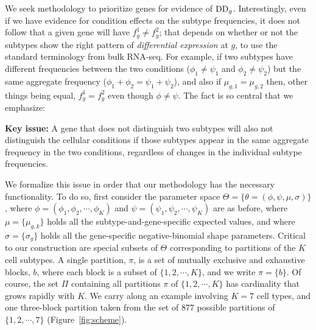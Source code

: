 \documentclass[aoas,preprint]{imsart}
\begin{document}
We seek methodology to prioritize genes for evidence
of ${\rm DD}_g$.  Interestingly, even if we have evidence for condition effects
on the subtype frequencies, it does not follow that a given
gene will have $f^1_g \neq f^2_g$; that depends on whether or not the subtypes
show the right pattern of {\em differential expression} at $g$, to use the 
standard terminology from bulk RNA-seq.  For example, if two subtypes have 
different frequencies between the two conditions ($\phi_1 \neq \psi_1$ and 
 $\phi_2 \neq \psi_2$) but the same aggregate frequency
($\phi_1+\phi_2 = \psi_1 + \psi_2$),  and also  if $\mu_{g,1} = \mu_{g,2}$
then, other things being equal, $f^1_g = f^2_g$ even though $\phi \neq \psi$. The fact
is so central that we emphasize:


\noindent
{\bf Key issue:} A gene that does not distinguish two subtypes will also not distinguish
the cellular conditions if those subtypes appear in the same aggregate frequency
in the two conditions, regardless of changes in the individual subtype 
frequencies. 

 We formalize this issue in order that our methodology
has the necessary functionality.  To do so,  first consider the parameter space 
$\Theta = \{ \theta=(\phi, \psi,\mu, \sigma)  \}$,
where $\phi=(\phi_1, \phi_2, \cdots, \phi_K)$ and $\psi=(\psi_1, \psi_2, \cdots, \psi_K)$ 
are as before, where $\mu = \{ \mu_{g,k} \}$ holds  all the subtype-and-gene-specific expected
values, and where $\sigma = \{ \sigma_g \}$ holds all the gene-specific negative-binomial
shape parameters.  Critical to our construction are special subsets of $\Theta$ corresponding
to partitions of the $K$ cell subtypes.  A single partition, $\pi$, is a set of
mutually exclusive and exhaustive blocks, $b$, where each block is a subset of $\{1, 2, 
\cdots, K\}$, and we write $\pi = \{ b \}$.  Of course,
the set $\Pi$ containing all partitions $\pi$ of $\{1,2, \cdots, K\}$
 has cardinality that grows rapidly with $K$. 
 We carry along an example
involving $K=7$ cell types, and one three-block partition taken
from the set of 877 possible partitions of $\{1, 2, \cdots, 7\}$ (Figure~\ref{fig:scheme}).
\end{document}
